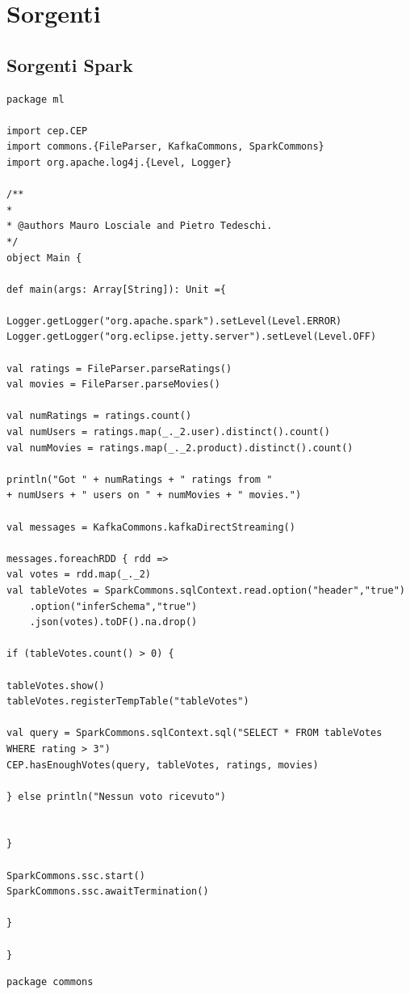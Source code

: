 \documentclass[12pt]{article}
\begin{document}
\section{Sorgenti}
\begin{appendices}
	\section{Sorgenti Spark}
	\begin{lstlisting}[style=scalacode, caption=Main.scala]
package ml

import cep.CEP
import commons.{FileParser, KafkaCommons, SparkCommons}
import org.apache.log4j.{Level, Logger}

/**
*
* @authors Mauro Losciale and Pietro Tedeschi.
*/
object Main {

def main(args: Array[String]): Unit ={

Logger.getLogger("org.apache.spark").setLevel(Level.ERROR)
Logger.getLogger("org.eclipse.jetty.server").setLevel(Level.OFF)

val ratings = FileParser.parseRatings()
val movies = FileParser.parseMovies()

val numRatings = ratings.count()
val numUsers = ratings.map(_._2.user).distinct().count()
val numMovies = ratings.map(_._2.product).distinct().count()

println("Got " + numRatings + " ratings from "
+ numUsers + " users on " + numMovies + " movies.")

val messages = KafkaCommons.kafkaDirectStreaming()

messages.foreachRDD { rdd =>
val votes = rdd.map(_._2)
val tableVotes = SparkCommons.sqlContext.read.option("header","true")
	.option("inferSchema","true")
	.json(votes).toDF().na.drop()

if (tableVotes.count() > 0) {

tableVotes.show()
tableVotes.registerTempTable("tableVotes")

val query = SparkCommons.sqlContext.sql("SELECT * FROM tableVotes WHERE rating > 3")
CEP.hasEnoughVotes(query, tableVotes, ratings, movies)

} else println("Nessun voto ricevuto")


}

SparkCommons.ssc.start()
SparkCommons.ssc.awaitTermination()

}

}
	\end{lstlisting}
	\begin{lstlisting}[style=scalacode, caption=SparkCommons.scala]
		package commons
		

\end{lstlisting}
\end{appendices}
\end{document}
